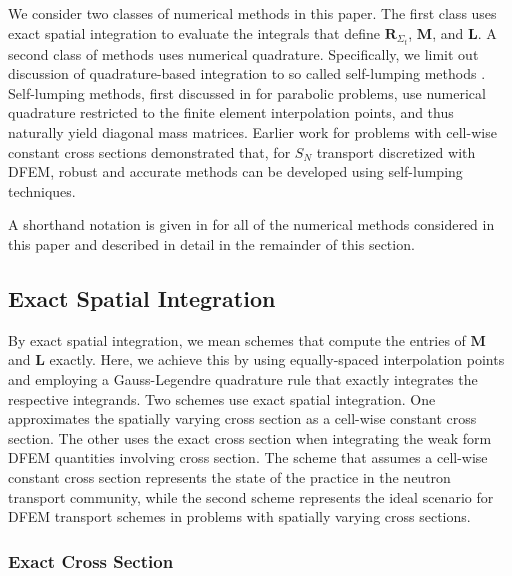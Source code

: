 We consider two classes of numerical methods in this paper.
The first class uses exact spatial integration to evaluate the integrals that define $\mathbf{R}_{\Sigma_t}$, $\mathbf{M}$, and $\mathbf{L}$.
A second class of methods uses numerical quadrature.  
Specifically, we limit out discussion of quadrature-based integration to so called self-lumping methods \cite{part_1_paper}.  
Self-lumping methods, first discussed in \cite{raviart, thomee} for parabolic problems, use numerical quadrature restricted to the finite element interpolation points, and thus naturally yield diagonal mass matrices.  
Earlier work for problems with cell-wise constant cross sections \cite{part_1_paper} demonstrated that, for $S_N$ transport discretized with DFEM, robust and accurate methods can be developed using self-lumping techniques.

A shorthand notation is given in  for all of the numerical methods considered in this paper and described in detail in the remainder of this section.

\subsection{Exact Spatial Integration}

By exact spatial integration, we mean schemes that compute the entries of  $\mathbf{M}$ and $\mathbf{L}$ exactly. Here, we achieve this by using equally-spaced interpolation points and employing a Gauss-Legendre quadrature rule  \cite{abramowitz} that exactly integrates the respective integrands.
Two schemes use exact spatial integration.  
One approximates the spatially varying cross section as a cell-wise constant cross section.
The other uses the exact cross section when integrating the weak form DFEM quantities involving cross section.  
The scheme that assumes a cell-wise constant cross section represents the state of the practice in the neutron transport community, while the second scheme represents the ideal scenario for DFEM transport schemes in problems with spatially varying cross sections.

\subsubsection{Exact Cross Section}

